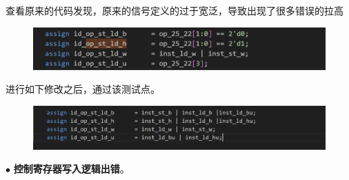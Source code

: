 \documentclass[11pt]{article}
\begin{document}
查看原来的代码发现，原来的信号定义的过于宽泛，导致出现了很多错误的拉高
\begin{figure}[H]
    \centering
    \includegraphics[width=15cm]{fig/3.png}
  \end{figure}
进行如下修改之后，通过该测试点。
\begin{figure}[H]
    \centering
    \includegraphics[width=15cm]{fig/4.png}
  \end{figure}

  \noindent
  $\bullet$
  \textbf{控制寄存器写入逻辑出错}。
\end{document}
